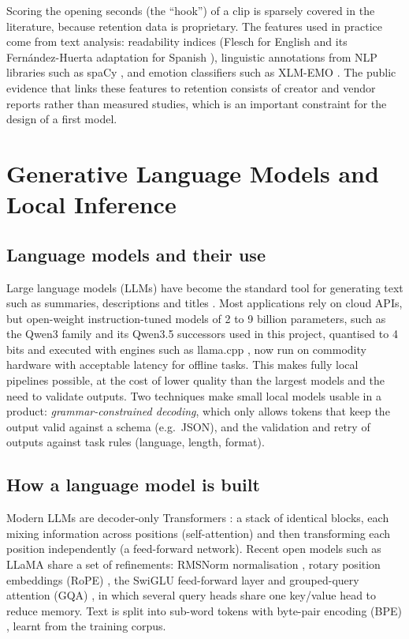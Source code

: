 Scoring the opening seconds (the ``hook'') of a clip is sparsely covered in the literature, because retention data is proprietary. The features used in practice come from text analysis: readability indices (Flesch \cite{flesch1948} for English and its Fernández-Huerta adaptation for Spanish \cite{fernandezhuerta1959}), linguistic annotations from NLP libraries such as spaCy \cite{spacy2020}, and emotion classifiers such as XLM-EMO \cite{bianchi2022xlmemo}. The public evidence that links these features to retention consists of creator and vendor reports rather than measured studies, which is an important constraint for the design of a first model.

\section{Generative Language Models and Local Inference}

\subsection*{Language models and their use}

Large language models (LLMs) have become the standard tool for generating text such as summaries, descriptions and titles \cite{cao2023aigc}. Most applications rely on cloud APIs, but open-weight instruction-tuned models of 2 to 9 billion parameters, such as the Qwen3 family \cite{qwen3report} and its Qwen3.5 successors used in this project, quantised to 4 bits and executed with engines such as llama.cpp \cite{llamacpp}, now run on commodity hardware with acceptable latency for offline tasks. This makes fully local pipelines possible, at the cost of lower quality than the largest models and the need to validate outputs. Two techniques make small local models usable in a product: \textit{grammar-constrained decoding}, which only allows tokens that keep the output valid against a schema (e.g.\ JSON), and the validation and retry of outputs against task rules (language, length, format).

\subsection*{How a language model is built}

Modern LLMs are decoder-only Transformers \cite{vaswani2017attention}: a stack of identical blocks, each mixing information across positions (self-attention) and then transforming each position independently (a feed-forward network). Recent open models such as LLaMA \cite{touvron2023llama} share a set of refinements: RMSNorm normalisation \cite{zhang2019rmsnorm}, rotary position embeddings (RoPE) \cite{su2024roformer}, the SwiGLU feed-forward layer \cite{shazeer2020glu} and grouped-query attention (GQA) \cite{ainslie2023gqa}, in which several query heads share one key/value head to reduce memory. Text is split into sub-word tokens with byte-pair encoding (BPE) \cite{sennrich2016bpe}, learnt from the training corpus.

